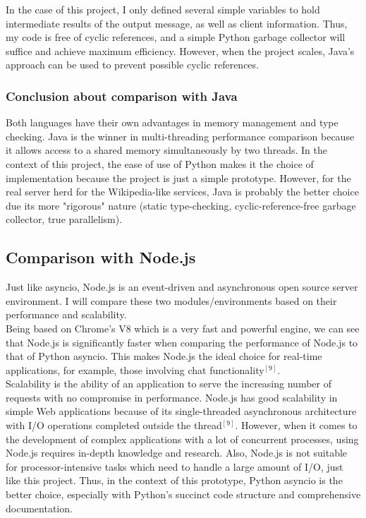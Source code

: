 \documentclass[letterpaper,twocolumn,10pt]{article}
\begin{document}
In the case of this project, I only defined several simple variables to hold intermediate results of the output message, as well as client information. Thus, my code is free of cyclic references, and a simple Python garbage collector will suffice and achieve maximum efficiency. However, when the project scales, Java's approach can be used to prevent possible cyclic references.

\subsubsection{Conclusion about comparison with Java}
Both languages have their own advantages in memory management and type checking. Java is the winner in multi-threading performance comparison because it allows access to a shared memory simultaneously by two threads. In the context of this project, the ease of use of Python makes it the choice of implementation because the project is just a simple prototype. However, for the real server herd for the Wikipedia-like services, Java is probably the better choice due its more "rigorous" nature (static type-checking, cyclic-reference-free garbage collector, true parallelism).
\subsection{Comparison with Node.js}
Just like asyncio, Node.js is an event-driven and asynchronous open source server environment. I will compare these two modules/environments based on their performance and scalability. \\

Being based on Chrome’s V8 which is a very fast and powerful engine, we can see that Node.js is significantly faster when comparing the performance of Node.js to that of Python asyncio. This makes Node.js the ideal choice for real-time applications, for example, those involving chat functionality$^{[9]}$.  \\

Scalability is the ability of an application to serve the increasing number of requests with no compromise in performance. Node.js has good scalability in simple Web applications because of its single-threaded asynchronous architecture with I/O operations completed outside the thread$^{[9]}$. However, when it comes to the development of complex applications with a lot of concurrent processes, using Node.js requires in-depth knowledge and research. Also, Node.js is not suitable for processor-intensive tasks which need to handle a large amount of I/O, just like this project. Thus, in the context of this prototype, Python asyncio is the better choice, especially with Python's succinct code structure and comprehensive documentation.
\end{document}
